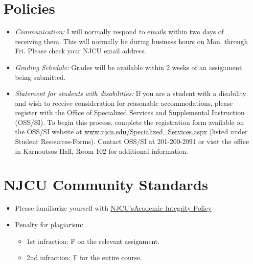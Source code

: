 \documentclass[11pt,article,oneside]{memoir}
\begin{document}
\section{Policies}

\begin{itemize}
\item \textit{Communication:} I will normally respond to emails within two
days of receiving them. This will normally be during business hours on
Mon. through Fri. Please check your NJCU email address.

\item \textit{Grading Schedule:} Grades will be available within 2 weeks of an
assignment being submitted.

\item \textit{Statement for students with disabilities:} If you are a student
with a disability and wish to receive consideration for reasonable
accommodations, please register with the Office of Specialized Services
and Supplemental Instruction (OSS/SI). To begin this process, complete
the registration form available on the OSS/SI website at
\href{http://www.njcu.edu/Specialized_Services.aspx}{www.njcu.edu/Specialized\_Services.aspx}
(listed under Student Resources-Forms). Contact OSS/SI at 201-200-2091
or visit the office in Karnoutsos Hall, Room 102 for additional
information.
\end{itemize}

\section{NJCU Community Standards}

\begin{itemize} 
\item Please familiarize yourself with \href{http://www.njcu.edu/uploadedFiles/About_NJCU/Governance_and_Organization/University_Senate/Policies/Academic\%20INTEGRITY\%20POLICY\%20FINAL\%202-04.pdf}{NJCU'sAcademic Integrity Policy}
\item Penalty for plagiarism:
\begin{itemize}
\item 1st infraction: F on the relevant assignment. 
\item 2nd infraction: F for the entire course. 
\end{itemize}
\end{itemize}
\end{document}
